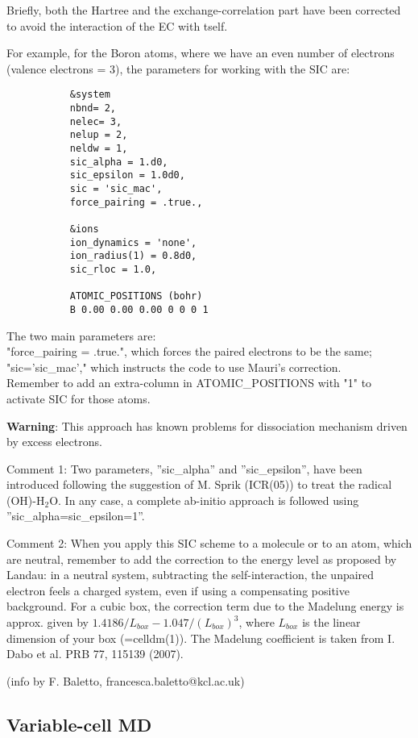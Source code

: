 \documentclass[12pt,a4paper]{article}
\begin{document}
Briefly, both the Hartree and the exchange-correlation part have been 
corrected to avoid the interaction of the EC with tself.

For example, for the Boron atoms, where we have an even number of 
electrons (valence electrons = 3), the parameters for working with
the SIC are:
\begin{verbatim}
           &system
           nbnd= 2,
           nelec= 3,
           nelup = 2,
           neldw = 1,
           sic_alpha = 1.d0,
           sic_epsilon = 1.0d0,
           sic = 'sic_mac',
           force_pairing = .true.,

           &ions
           ion_dynamics = 'none',
           ion_radius(1) = 0.8d0,
           sic_rloc = 1.0,

           ATOMIC_POSITIONS (bohr)
           B 0.00 0.00 0.00 0 0 0 1
\end{verbatim}
The two main parameters are:\\
"force\_pairing = .true.", which forces the paired electrons to be the same;\\ 
"sic='sic\_mac'," which instructs the code to use Mauri's correction.\\
Remember to add an extra-column in ATOMIC\_POSITIONS with "1" to activate
SIC for those atoms.

{\bf Warning}: 
This approach has known problems for dissociation mechanism
driven by excess electrons.

Comment 1:
Two parameters, ''sic\_alpha'' and ''sic\_epsilon'', have been introduced 
following the suggestion of M. Sprik (ICR(05)) to treat the radical
(OH)-H$_2$O. In any case, a complete ab-initio approach is followed 
using ''sic\_alpha=sic\_epsilon=1''.

Comment 2:
When you apply this SIC scheme to a molecule or to an atom, which are neutral,
remember to add the correction to the energy level as proposed by Landau: 
in a neutral system, subtracting the self-interaction, the unpaired electron
feels a charged system, even if using a compensating positive background. 
For a cubic box, the correction term due to the Madelung energy is approx. 
given by $1.4186/L_{box} - 1.047/(L_{box})^3$, where $L_{box}$ is the 
linear dimension of your box (=celldm(1)). The Madelung coefficient is 
taken from I. Dabo et al. PRB 77, 115139 (2007).

(info by F. Baletto, francesca.baletto@kcl.ac.uk)

\subsection{ Variable-cell MD }
\end{document}
